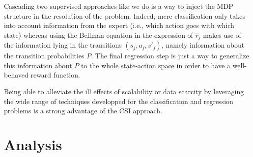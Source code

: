 \documentclass[smallextended]{svjour3}
\begin{document}
Cascading two supervised approaches like we do is a way to inject the MDP structure in the resolution of the problem. Indeed, mere classification only takes into account information from the expert (i.e., which action goes with which state) whereas using the Bellman equation in the expression of $\hat r_j$ makes use of the information lying in the transitions $(s_j,a_j,s'_j)$, namely information about the transition probabilities $P$. The final regression step is just a way to generalize this information about $P$ to the whole state-action space in order to have a well-behaved reward function.

Being able to alleviate the ill effects of scalability or data scarcity by leveraging the wide range of techniques developped for the classification and regression problems is a strong advantage of the CSI approach.

\section{Analysis}
\label{sec:analysis}
\end{document}
